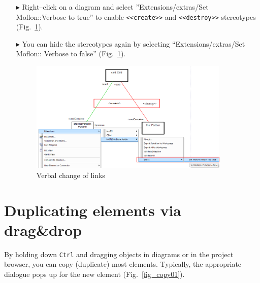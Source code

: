 \begin{enumerate}
\item[$\blacktriangleright$] 
Right–click on a diagram and select ''Extensions/extras/Set Moflon::Verbose to
true'' to enable \texttt{<<create>>} and \texttt{<<destroy>>} stereotypes (Fig.~\ref{fig_usingVerbose01}).

\item[$\blacktriangleright$] You can hide the stereotypes again by selecting
``Extensions/extras/Set Moflon:: Verbose to
false'' (Fig.~\ref{fig_usingVerbose01}).

\begin{figure}[htbp]
\begin{center}
  \includegraphics[width=0.9\textwidth]{pics/tricks/usingVerbose/usingVerbose1}
  \caption{Verbal change of links}  
  \label{fig_usingVerbose01}
\end{center}
\end{figure}
\end{enumerate}


\section{Duplicating elements via drag\&drop}
By holding down \texttt{Ctrl} and dragging objects in diagrams or in the project browser, you can copy (duplicate) most elements.
Typically, the appropriate dialogue pops up for the new element (Fig.~\ref{fig_copy01}).

